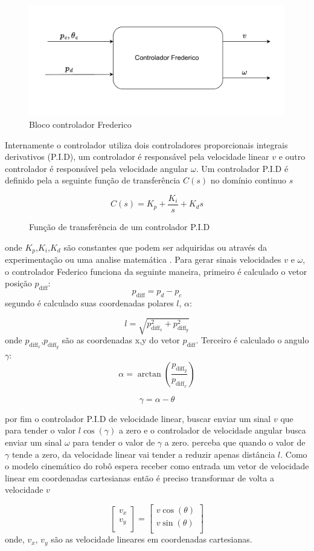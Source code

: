 \begin{figure}[H]
    \centering
    \includegraphics[scale=0.8]{figuras/controlador_frederico.pdf}
    \caption{Bloco controlador Frederico}
\end{figure}

Internamente o controlador utiliza  dois controladores proporcionais
integrais derivativos (P.I.D), um controlador é responsável pela velocidade linear $v$
e outro controlador é responsável pela velocidade angular $\omega$. 
Um controlador P.I.D é definido pela a seguinte função de
transferência $C(s)$ no domínio continuo $s$

\begin{figure}[H]
    \[
        C(s) = K_p + \frac{K_i}{s} + K_ds
    \]
    \caption{Função de transferência de um controlador P.I.D }
\end{figure}
onde $K_p$,$K_i$,$K_d$ são constantes que podem ser adquiridas ou
através da experimentação ou uma analise matemática \cite{ogataengenharia}. Para gerar sinais
velocidades $v$ e $\omega$,  o controlador Federico funciona da seguinte
maneira, primeiro é calculado o vetor posição $p_{\text{diff}}$:
\[
    p_{\text{diff}} = p_d - p_c 
\]
segundo é calculado suas coordenadas polares $l$, $\alpha$:

\[
    l = \sqrt{p_{\text{diff}_x}^2 + p_{\text{diff}_y}^2}
\]
onde $p_{\text{diff}_x}$,$p_{\text{diff}_y}$ são as coordenadas x,y
do vetor $p_{\text{diff}}$.  Terceiro é calculado o angulo $\gamma$:
\[
    \alpha =  \arctan(\frac{ p_{\text{diff}_y}}{p_{\text{diff}_x}}) 
\]

\[
    \gamma =  \alpha - \theta
\]


por fim o controlador P.I.D de velocidade
linear, buscar enviar um sinal $v$ que para tender o valor $l \cos(\gamma)$
a zero e o controlador de velocidade angular busca enviar um sinal $\omega$
para  tender o valor de $\gamma$ a zero. perceba que quando o valor de $\gamma$
tende a zero, da velocidade linear vai tender a reduzir apenas
distância $l$. Como o modelo cinemático do robô espera receber como entrada
um vetor de velocidade linear em coordenadas cartesianas então é preciso
transformar de volta a velocidade $v$ 

\[
    \begin{bmatrix}
        v_x \\
        v_y \\
    \end{bmatrix}
    =
    \begin{bmatrix}
        v\cos(\theta) \\
        v\sin(\theta) \\
    \end{bmatrix}
\]
onde, $v_x$, $v_y$ são as velocidade lineares em coordenadas cartesianas.